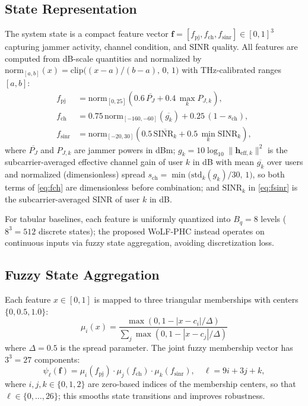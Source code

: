 \documentclass[10pt,conference]{IEEEtran}
\newcommand{\vect}[1]{\mathbf{#1}}
\begin{document}
\subsection{State Representation}

The system state is a compact feature vector
$\mathbf{f} = [f_{\mathrm{pj}}, f_{\mathrm{ch}}, f_{\mathrm{sinr}}] \in [0,1]^3$ capturing jammer activity, channel condition, and SINR quality. All features are computed from dB-scale quantities and normalized by $\text{norm}_{[a,b]}(x) = \text{clip}\!\big((x-a)/(b-a),\,0,\,1\big)$ with THz-calibrated ranges $[a,b]$:
\begin{align}
f_{\mathrm{pj}} &=
\text{norm}_{[0,25]}\!\left(
0.6\,\overline{P_J} + 0.4\,\max_k P_{J,k}
\right), \label{eq:fpj}\\
f_{\mathrm{ch}} &=
0.75\,\text{norm}_{[-160,-60]}\!\left(\overline{g_k}\right) + 0.25\,(1-s_{\mathrm{ch}}), \label{eq:fch}\\
f_{\mathrm{sinr}} &=
\text{norm}_{[-20,30]}\!\left(
0.5\,\overline{\mathrm{SINR}_k} + 0.5\,\min_k \mathrm{SINR}_k
\right), \label{eq:fsinr}
\end{align}
where $\overline{P_J}$ and $P_{J,k}$ are jammer powers in dBm; $g_k = 10\log_{10}\|\mathbf{h}_{\mathrm{eff},k}\|^2$ is the subcarrier-averaged effective channel gain of user $k$ in dB with mean $\overline{g_k}$ over users and normalized (dimensionless) spread $s_{\mathrm{ch}} = \min\!\big(\mathrm{std}_k(g_k)/30,\,1\big)$, so both terms of \eqref{eq:fch} are dimensionless before combination; and $\mathrm{SINR}_k$ in \eqref{eq:fsinr} is the subcarrier-averaged SINR of user $k$ in dB.

For tabular baselines, each feature is uniformly quantized into $B_q=8$ levels ($8^3=512$ discrete states); the proposed WoLF-PHC instead operates on continuous inputs via fuzzy state aggregation, avoiding discretization loss.


\subsection{Fuzzy State Aggregation}

Each feature $x \in [0,1]$ is mapped to three triangular memberships with centers $\{0,0.5,1.0\}$:
\begin{equation}
\mu_i(x) = \frac{\max(0, 1 - |x - c_i|/\Delta)}{\sum_j \max(0, 1 - |x - c_j|/\Delta)}
\label{eq:fuzzy}
\end{equation}
where $\Delta = 0.5$ is the spread parameter. The joint fuzzy membership vector has $3^3 = 27$ components:
\begin{equation}
\psi_\ell(\vect{f}) = \mu_i(f_{\text{pj}}) \cdot \mu_j(f_{\text{ch}}) \cdot \mu_k(f_{\text{sinr}}), \quad \ell = 9i + 3j + k,
\label{eq:fuzzy_joint}
\end{equation}
where $i,j,k \in \{0,1,2\}$ are zero-based indices of the membership centers, so that $\ell \in \{0,\dots,26\}$; this smooths state transitions and improves robustness.
\end{document}

